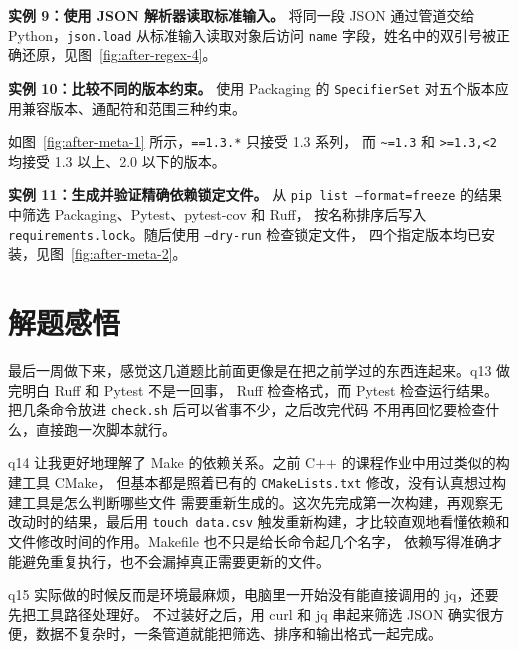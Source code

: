 \documentclass[12pt,a4paper,fontset=fandol]{ctexart}
\begin{document}
\noindent\textbf{实例 9：使用 JSON 解析器读取标准输入。}
将同一段 JSON 通过管道交给 Python，\texttt{json.load} 从标准输入读取对象后访问
\texttt{name} 字段，姓名中的双引号被正确还原，见图~\ref{fig:after-regex-4}。


\noindent\textbf{实例 10：比较不同的版本约束。}
使用 Packaging 的 \texttt{SpecifierSet} 对五个版本应用兼容版本、通配符和范围三种约束。



如图~\ref{fig:after-meta-1} 所示，\texttt{==1.3.*} 只接受 1.3 系列，
而 \texttt{\textasciitilde=1.3} 和 \texttt{>=1.3,<2} 均接受 1.3 以上、2.0 以下的版本。


\noindent\textbf{实例 11：生成并验证精确依赖锁定文件。}
从 \texttt{pip list --format=freeze} 的结果中筛选 Packaging、Pytest、pytest-cov 和 Ruff，
按名称排序后写入 \texttt{requirements.lock}。随后使用 \texttt{--dry-run} 检查锁定文件，
四个指定版本均已安装，见图~\ref{fig:after-meta-2}。


\FloatBarrier

\section{解题感悟}

最后一周做下来，感觉这几道题比前面更像是在把之前学过的东西连起来。q13 做完明白 Ruff 和 Pytest 不是一回事，
Ruff 检查格式，而 Pytest 检查运行结果。把几条命令放进 \texttt{check.sh} 后可以省事不少，之后改完代码
不用再回忆要检查什么，直接跑一次脚本就行。

q14 让我更好地理解了 Make 的依赖关系。之前 C++ 的课程作业中用过类似的构建工具 CMake，
但基本都是照着已有的 \texttt{CMakeLists.txt} 修改，没有认真想过构建工具是怎么判断哪些文件
需要重新生成的。这次先完成第一次构建，再观察无改动时的结果，最后用 \texttt{touch data.csv}
触发重新构建，才比较直观地看懂依赖和文件修改时间的作用。Makefile 也不只是给长命令起几个名字，
依赖写得准确才能避免重复执行，也不会漏掉真正需要更新的文件。

q15 实际做的时候反而是环境最麻烦，电脑里一开始没有能直接调用的 jq，还要先把工具路径处理好。
不过装好之后，用 curl 和 jq 串起来筛选 JSON 确实很方便，数据不复杂时，一条管道就能把筛选、排序和输出格式一起完成。
\end{document}
